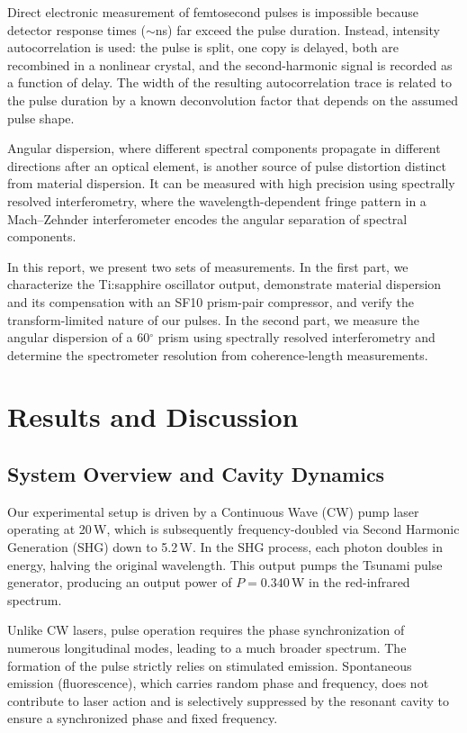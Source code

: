 \documentclass[twocolumn,10pt,a4paper]{article}
\begin{document}
Direct electronic measurement of femtosecond pulses is impossible because detector response times ($\sim$ns) far exceed the pulse duration. Instead, intensity autocorrelation is used: the pulse is split, one copy is delayed, both are recombined in a nonlinear crystal, and the second-harmonic signal is recorded as a function of delay. The width of the resulting autocorrelation trace is related to the pulse duration by a known deconvolution factor that depends on the assumed pulse shape.

Angular dispersion, where different spectral components propagate in different directions after an optical element, is another source of pulse distortion distinct from material dispersion. It can be measured with high precision using spectrally resolved interferometry, where the wavelength-dependent fringe pattern in a Mach--Zehnder interferometer encodes the angular separation of spectral components.

In this report, we present two sets of measurements. In the first part, we characterize the Ti:sapphire oscillator output, demonstrate material dispersion and its compensation with an SF10 prism-pair compressor, and verify the transform-limited nature of our pulses. In the second part, we measure the angular dispersion of a 60$^\circ$ prism using spectrally resolved interferometry and determine the spectrometer resolution from coherence-length measurements.

\section{Results and Discussion}

\subsection{System Overview and Cavity Dynamics}
Our experimental setup is driven by a Continuous Wave (CW) pump laser operating at 20\,W, which is subsequently frequency-doubled via Second Harmonic Generation (SHG) down to 5.2\,W. In the SHG process, each photon doubles in energy, halving the original wavelength. This output pumps the Tsunami pulse generator, producing an output power of $P = 0.340$\,W in the red-infrared spectrum.

Unlike CW lasers, pulse operation requires the phase synchronization of numerous longitudinal modes, leading to a much broader spectrum. The formation of the pulse strictly relies on stimulated emission. Spontaneous emission (fluorescence), which carries random phase and frequency, does not contribute to laser action and is selectively suppressed by the resonant cavity to ensure a synchronized phase and fixed frequency.
\end{document}
